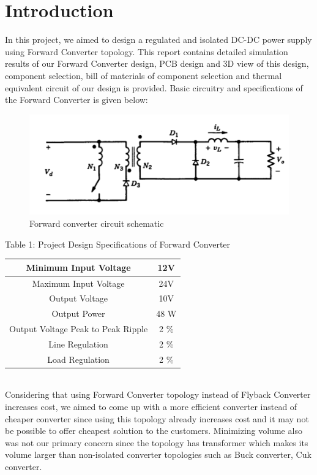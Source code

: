 \documentclass{article}
\newcommand\tab[1][1cm]{\hspace*{#1}}
\begin{document}
\section*{Introduction}
\tab In this project, we aimed to design a regulated and isolated DC-DC power supply using Forward Converter topology. This report contains detailed simulation results of our Forward Converter design, PCB design and 3D view of this design, component selection, bill of materials of component selection and thermal equivalent circuit of our design is provided. Basic circuitry and specifications of the Forward Converter is given below:
\begin{figure}[h]
    \centering
    \includegraphics[scale=0.5]{forwardconverter.PNG}
    \caption{Forward converter circuit schematic }
    \label{fig:my_label}
\end{figure}

\begin{center}
Table 1: Project Design Specifications of Forward Converter
\newline \\

 \begin{tabular}{||c c||} 
 \hline
 Minimum Input Voltage & 12V \\ 
 \hline
 Maximum Input Voltage & 24V  \\
 \hline
 Output Voltage & 10V  \\
 \hline
 Output Power & 48 W  \\
 \hline
 Output Voltage Peak to Peak Ripple & 2 \% \\
 \hline
  Line Regulation & 2 \% \\
 \hline
  Load Regulation & 2 \% \\
 \hline
 \end{tabular}
 \end{center} \\
 
 \tab Considering that using Forward Converter topology instead of Flyback Converter increases cost, we aimed to come up with a more efficient converter instead of cheaper converter since using this topology already increases cost and it may not be possible to offer cheapest solution to the customers. Minimizing volume also was not our primary concern since the topology has transformer which makes its volume larger than non-isolated converter topologies such as Buck converter, Cuk converter.
 
\end{document}
